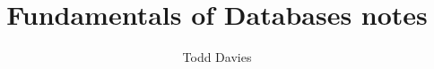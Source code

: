 \newcommand{\coursename}{Fundamentals of Databases}
\newcommand{\coursecode}{COMP23111}
\newcommand{\courseinfo}{}
\newcommand{\Author}{Todd Davies} 
\newcommand{\Title}{Fundamentals of Databases notes}
\author{\Author}
\title{\Title}
